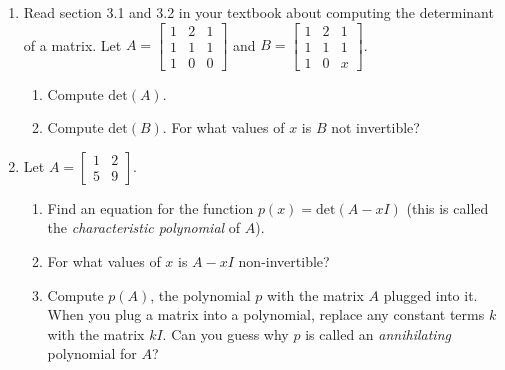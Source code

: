 \documentclass[letter]{article}
\newcommand{\Det}{\mathrm{det}}
\newcommand{\mat}[1]{\begin{bmatrix}#1\end{bmatrix}}
\begin{document}
\begin{enumerate}
		\item Read section 3.1 and 3.2 in your textbook about computing the determinant of a matrix.
			Let $A=\mat{1&2&1\\1&1&1\\1&0&0}$ and $B=\mat{1&2&1\\1&1&1\\1&0&x}$.
		\begin{enumerate}
			\item Compute $\Det(A)$.
			\item Compute $\Det(B)$.  For what values of $x$ is $B$ not invertible?
		\end{enumerate}

		\item Let $A=\mat{1&2\\5&9}$.
		\begin{enumerate}
			\item Find an equation for the function $p(x)=\Det(A-xI)$ (this is called the
				\emph{characteristic polynomial} of $A$).
			\item For what values of $x$ is $A-xI$ non-invertible?
			\item Compute $p(A)$, the polynomial $p$ with the matrix $A$ plugged into it.  When you plug a matrix
				into a polynomial, replace any constant terms $k$ with the matrix $kI$.
				Can you guess
				why $p$ is called an \emph{annihilating} polynomial for $A$?
		\end{enumerate}


\end{enumerate}
\end{document}
